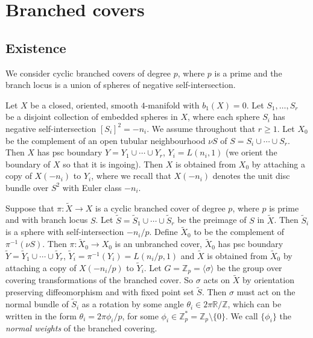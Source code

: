 \documentclass{amsart}
\theoremstyle{definition}
\theoremstyle{remark}
\numberwithin{equation}{section}
\begin{document}
\section{Branched covers}\label{sec:branch}

\subsection{Existence}\label{sec:ex}

We consider cyclic branched covers of degree $p$, where $p$ is a prime and the branch locus is a union of spheres of negative self-intersection. 

Let $X$ be a closed, oriented, smooth $4$-manifold with $b_1(X) = 0$. Let $S_1, \dots , S_r$ be a disjoint collection of embedded spheres in $X$, where each sphere $S_i$ has negative self-intersection $[S_i]^2 = -n_i$. We assume throughout that $r \ge 1$. Let $X_0$ be the complement of an open tubular neighbourhood $\nu S$ of $S = S_i \cup \cdots \cup S_r$. Then $X$ has psc boundary $Y = Y_1 \cup \cdots \cup Y_r$, $Y_i = L(n_i,1)$ (we orient the boundary of $X$ so that it is ingoing). Then $X$ is obtained from $X_0$ by attaching a copy of $X(-n_i)$ to $Y_i$, where we recall that $X(-n_i)$ denotes the unit disc bundle over $S^2$ with Euler class $-n_i$. 

Suppose that $\pi : \widetilde{X} \to X$ is a cyclic branched cover of degree $p$, where $p$ is prime and with branch locus $S$. Let $\widetilde{S} = \widetilde{S}_1 \cup \cdots \cup \widetilde{S}_r$ be the preimage of $S$ in $\widetilde{X}$. Then $\widetilde{S}_i$ is a sphere with self-intersection $-n_i/p$. Define $\widetilde{X}_0$ to be the complement of $\pi^{-1}(\nu S)$. Then $\pi : \widetilde{X}_0 \to X_0$ is an unbranched cover, $\widetilde{X}_0$ has psc boundary $\widetilde{Y} = \widetilde{Y}_1 \cup \cdots \cup \widetilde{Y}_r$, $\widetilde{Y}_i = \pi^{-1}(Y_i) = L(n_i/p , 1)$ and $\widetilde{X}$ is obtained from $\widetilde{X}_0$ by attaching a copy of $X(-n_i/p)$ to $\widetilde{Y}_i$. Let $G = \mathbb{Z}_p = \langle \sigma \rangle$ be the group over covering transformations of the branched cover. So $\sigma$ acts on $\widetilde{X}$ by orientation preserving diffeomorphism and with fixed point set $\widetilde{S}$. Then $\sigma$ must act on the normal bundle of $\widetilde{S}_i$ as a rotation by some angle $\theta_i \in 2\pi \mathbb{R}/\mathbb{Z}$, which can be written in the form $\theta_i = 2\pi \phi_i/p$, for some $\phi_i \in \mathbb{Z}_p^* = \mathbb{Z}_p \setminus \{0\}$. We call $\{ \phi_i \}$ the {\em normal weights} of the branched covering.
\end{document}
